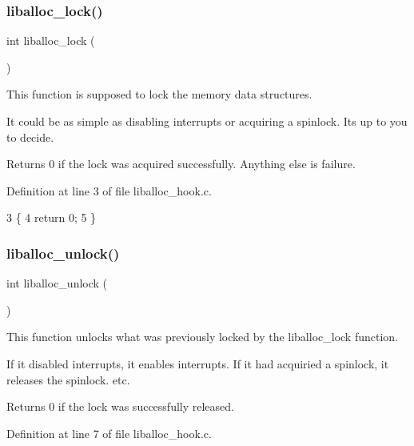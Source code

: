 \subsubsection{\texorpdfstring{liballoc\+\_\+lock()}{liballoc\_lock()}}
{\footnotesize\ttfamily int liballoc\+\_\+lock (\begin{DoxyParamCaption}{ }\end{DoxyParamCaption})}



This function is supposed to lock the memory data structures. 

It could be as simple as disabling interrupts or acquiring a spinlock. It\textquotesingle{}s up to you to decide.

\begin{DoxyReturn}{Returns}
0 if the lock was acquired successfully. Anything else is failure. 
\end{DoxyReturn}


Definition at line 3 of file liballoc\+\_\+hook.\+c.


\begin{DoxyCode}
3                     \{
4     \textcolor{keywordflow}{return} 0;
5 \}
\end{DoxyCode}
\mbox{\label{a00026_aedc23f198b2882d41d0caa316453967b_aedc23f198b2882d41d0caa316453967b}} 
\subsubsection{\texorpdfstring{liballoc\+\_\+unlock()}{liballoc\_unlock()}}
{\footnotesize\ttfamily int liballoc\+\_\+unlock (\begin{DoxyParamCaption}{ }\end{DoxyParamCaption})}



This function unlocks what was previously locked by the liballoc\+\_\+lock function. 

If it disabled interrupts, it enables interrupts. If it had acquiried a spinlock, it releases the spinlock. etc.

\begin{DoxyReturn}{Returns}
0 if the lock was successfully released. 
\end{DoxyReturn}


Definition at line 7 of file liballoc\+\_\+hook.\+c.



